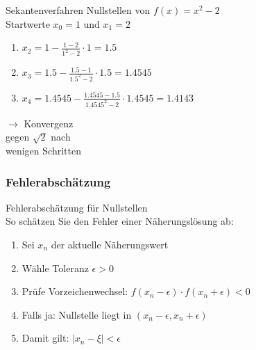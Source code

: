 \begin{example2}{Sekantenverfahren} Nullstellen von $f(x)=x^2-2$\\
Startwerte $x_0 = 1$ und $x_1 = 2$
\vspace{1mm}\\
\begin{minipage}[t]{0.65\textwidth}
    \vspace{-3mm}
    \begin{enumerate}
        \item $x_2 = 1 - \frac{1-2}{1^2-2} \cdot 1 = 1.5$
        \item $x_3 = 1.5 - \frac{1.5-1}{1.5^2-2} \cdot 1.5 = 1.4545$
        \item $x_4 = 1.4545 - \frac{1.4545-1.5}{1.4545^2-2} \cdot 1.4545 = 1.4143$
    \end{enumerate}
\end{minipage}
\hspace{2mm}
\begin{minipage}[t]{0.28\textwidth}
    $\rightarrow$ Konvergenz\\ gegen $\sqrt{2}$ nach \\wenigen Schritten
\end{minipage}
\end{example2}


\subsubsection{Fehlerabschätzung}



\begin{KR}{Fehlerabschätzung für Nullstellen}\\
So schätzen Sie den Fehler einer Näherungslösung ab:
\begin{enumerate}
    \item Sei $x_n$ der aktuelle Näherungswert
    \item Wähle Toleranz $\epsilon > 0$
    \item Prüfe Vorzeichenwechsel: $f(x_n-\epsilon) \cdot f(x_n+\epsilon) < 0$
    \item Falls ja: Nullstelle liegt in $(x_n-\epsilon, x_n+\epsilon)$
    \item Damit gilt: $|x_n-\xi| < \epsilon$
\end{enumerate}
\end{KR}


